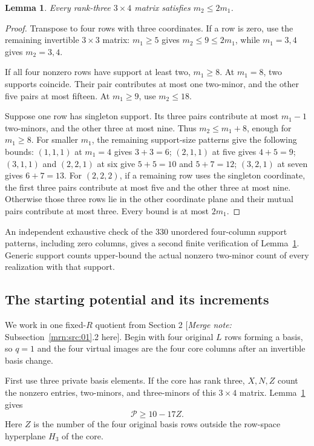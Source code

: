 \documentclass[11pt,a4paper]{article}
\newtheorem{lemma}[theorem]{Lemma}
\theoremstyle{remark}\newtheorem{remark}[theorem]{Remark}
\newcommand{\mnote}[1]{[\textit{Merge note:} #1]}
\begin{document}
\begin{lemma}\label{mrn:e:r8:lem:rectangular}
Every rank-three $3\times4$ matrix satisfies $m_2\le2m_1$.
\end{lemma}
\begin{proof}
Transpose to four rows with three coordinates. If a row is zero, use the remaining invertible $3\times3$ matrix: $m_1\ge5$ gives $m_2\le9\le2m_1$, while $m_1=3,4$ gives $m_2=3,4$.

If all four nonzero rows have support at least two, $m_1\ge8$. At $m_1=8$, two supports coincide. Their pair contributes at most one two-minor, and the other five pairs at most fifteen. At $m_1\ge9$, use $m_2\le18$.

Suppose one row has singleton support. Its three pairs contribute at most $m_1-1$ two-minors, and the other three at most nine. Thus $m_2\le m_1+8$, enough for $m_1\ge8$. For smaller $m_1$, the remaining support-size patterns give the following bounds: $(1,1,1)$ at $m_1=4$ gives $3+3=6$; $(2,1,1)$ at five gives $4+5=9$; $(3,1,1)$ and $(2,2,1)$ at six give $5+5=10$ and $5+7=12$; $(3,2,1)$ at seven gives $6+7=13$. For $(2,2,2)$, if a remaining row uses the singleton coordinate, the first three pairs contribute at most five and the other three at most nine. Otherwise those three rows lie in the other coordinate plane and their mutual pairs contribute at most three. Every bound is at most $2m_1$.
\end{proof}
An independent exhaustive check of the 330 unordered four-column support patterns, including zero columns, gives a second finite verification of Lemma~\ref{mrn:e:r8:lem:rectangular}. Generic support counts upper-bound the actual nonzero two-minor count of every realization with that support.

\subsection{The starting potential and its increments}
We work in one fixed-$R$ quotient from Section 2 \mnote{Subsection~\ref{mrn:src:01}.2 here}. Begin with four original $L$ rows forming a basis, so $q=1$ and the four virtual images are the four core columns after an invertible basis change.

First use three private basis elements. If the core has rank three, $X,N,Z$ count the nonzero entries, two-minors, and three-minors of this $3\times4$ matrix. Lemma~\ref{mrn:e:r8:lem:rectangular} gives
\begin{equation}\label{mrn:e:r8:eq:start}
 \mathcal P\ge10-17Z.
\end{equation}
Here $Z$ is the number of the four original basis rows outside the row-space hyperplane $H_3$ of the core.
\end{document}
